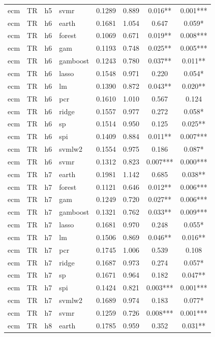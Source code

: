 \begin{ThreePartTable}
\begin{longtable}[t]{llclcccc}
ecm & TR & h5 & svmr & 0.1289 & 0.889 & 0.016** & 0.001***\\
\addlinespace
ecm & TR & h6 & earth & 0.1681 & 1.054 & 0.647 & 0.059*\\
ecm & TR & h6 & forest & 0.1069 & 0.671 & 0.019** & 0.008***\\
ecm & TR & h6 & gam & 0.1193 & 0.748 & 0.025** & 0.005***\\
ecm & TR & h6 & gamboost & 0.1243 & 0.780 & 0.037** & 0.011**\\
ecm & TR & h6 & lasso & 0.1548 & 0.971 & 0.220 & 0.054*\\
ecm & TR & h6 & lm & 0.1390 & 0.872 & 0.043** & 0.020**\\
ecm & TR & h6 & pcr & 0.1610 & 1.010 & 0.567 & 0.124\\
ecm & TR & h6 & ridge & 0.1557 & 0.977 & 0.272 & 0.058*\\
ecm & TR & h6 & sp & 0.1514 & 0.950 & 0.125 & 0.025**\\
ecm & TR & h6 & spi & 0.1409 & 0.884 & 0.011** & 0.007***\\
ecm & TR & h6 & svmlw2 & 0.1554 & 0.975 & 0.186 & 0.087*\\
ecm & TR & h6 & svmr & 0.1312 & 0.823 & 0.007*** & 0.000***\\
\addlinespace
ecm & TR & h7 & earth & 0.1981 & 1.142 & 0.685 & 0.038**\\
ecm & TR & h7 & forest & 0.1121 & 0.646 & 0.012** & 0.006***\\
ecm & TR & h7 & gam & 0.1249 & 0.720 & 0.027** & 0.006***\\
ecm & TR & h7 & gamboost & 0.1321 & 0.762 & 0.033** & 0.009***\\
ecm & TR & h7 & lasso & 0.1681 & 0.970 & 0.248 & 0.055*\\
ecm & TR & h7 & lm & 0.1506 & 0.869 & 0.046** & 0.016**\\
ecm & TR & h7 & pcr & 0.1745 & 1.006 & 0.539 & 0.108\\
ecm & TR & h7 & ridge & 0.1687 & 0.973 & 0.274 & 0.057*\\
ecm & TR & h7 & sp & 0.1671 & 0.964 & 0.182 & 0.047**\\
ecm & TR & h7 & spi & 0.1424 & 0.821 & 0.003*** & 0.001***\\
ecm & TR & h7 & svmlw2 & 0.1689 & 0.974 & 0.183 & 0.077*\\
ecm & TR & h7 & svmr & 0.1259 & 0.726 & 0.008*** & 0.001***\\
\addlinespace
ecm & TR & h8 & earth & 0.1785 & 0.959 & 0.352 & 0.031**\\

\end{longtable}
\end{ThreePartTable}
